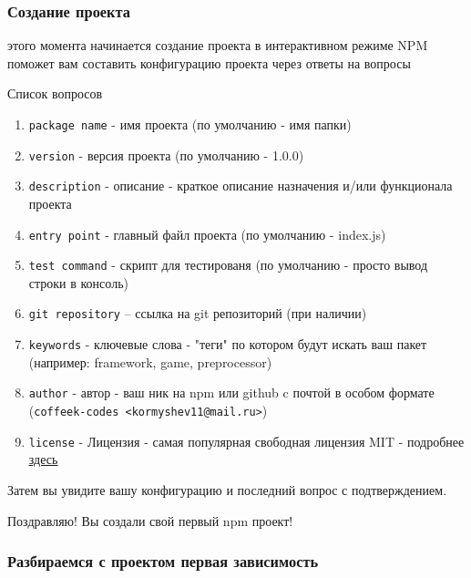 \documentclass[aspectratio=169]{beamer}
\begin{document}

\begin{frame}
  \frametitle{Создание проекта}
  \begin{center}
    
     этого момента начинается создание проекта в интерактивном режиме
    NPM поможет вам составить конфигурацию проекта через ответы на вопросы
  \end{center}
  \bigskip
  \begin{center}
    Список вопросов
  \end{center}

  \begin{enumerate}
  \item \texttt{package name} - имя проекта (по умолчанию - имя папки)
  \item \texttt{version} - версия проекта (по умолчанию - 1.0.0)
  \item \texttt{description} - описание - краткое описание назначения и/или функционала проекта
  \item \texttt{entry point} - главный файл проекта (по умолчанию - index.js)
  \item \texttt{test command} - скрипт для тестированя (по умолчанию - просто вывод строки в консоль)
  \item \texttt{git repository} -- ссылка на git репозиторий (при наличии)
  \item \texttt{keywords} - ключевые слова - "теги" по котором будут искать ваш пакет (например: framework, game, preprocessor)
  \item \texttt{author} - автор - ваш ник на npm или github c почтой в особом формате (\texttt{coffeek-codes <kormyshev11@mail.ru>})
  \item \texttt{license} - Лицензия - самая популярная свободная лицензия MIT - подробнее \underline{\href{https://wiki.merionet.ru/articles/sravnenie-open-source-licenzij/}{здесь}}
  \end{enumerate}

  \begin{center}
    Затем вы увидите вашу конфигурацию и последний вопрос с подтверждением.
  \end{center}

  \bigskip
  \bigskip
  \bigskip

  \begin{center}
    \large Поздравляю! Вы создали свой первый npm проект!
  \end{center}
  
\end{frame}


\begin{frame}
  \frametitle{Разбираемся с проектом первая зависимость}
\end{frame}
\end{document}
